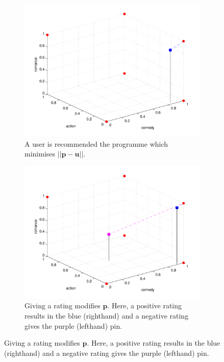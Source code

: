 			\begin{figure}[h!]
				\begin{center}
				\begin{subfigure}[t]{0.32\textwidth}
					\includegraphics[width=\textwidth]{images/recommender_1.pdf}
					\caption{A user is recommended the programme which minimises $||\mathbf{p} - \mathbf{u}||$.}
				\end{subfigure}
				\begin{subfigure}[t]{0.32\textwidth}
					\includegraphics[width=\textwidth]{images/recommender_2.pdf}
					\caption{Giving a rating modifies $\mathbf{p}$. Here, a positive rating results in the blue (righthand) and a negative rating gives the purple (lefthand) pin.}

\end{subfigure}
\end{center}
\end{figure}
